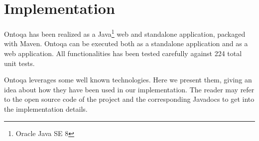 \section{Implementation}
\label{sec:implementation}

Ontoqa has been realized as a Java\footnote{Oracle Java SE 8} web and standalone application, packaged with Maven.
%
Ontoqa can be executed both as a standalone application and as a web application.
%
All functionalities has been tested carefully against 224 total unit tests.

Ontoqa leverages some well known technologies. Here we present them, giving an idea about how they have been used in our implementation. The reader may refer to the open source code of the project and the corresponding Javadocs to get into the implementation details.


